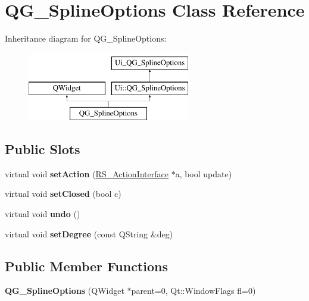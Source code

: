 \hypertarget{classQG__SplineOptions}{\section{Q\-G\-\_\-\-Spline\-Options Class Reference}
\label{classQG__SplineOptions}
}
Inheritance diagram for Q\-G\-\_\-\-Spline\-Options\-:\begin{figure}[H]
\begin{center}
\leavevmode
\includegraphics[height=3.000000cm]{classQG__SplineOptions}
\end{center}
\end{figure}
\subsection*{Public Slots}
\begin{DoxyCompactItemize}
\item 
\hypertarget{classQG__SplineOptions_a333671eee57233957fbc4f011434fd77}{virtual void {\bfseries set\-Action} (\hyperlink{classRS__ActionInterface}{R\-S\-\_\-\-Action\-Interface} $\ast$a, bool update)}\label{classQG__SplineOptions_a333671eee57233957fbc4f011434fd77}

\item 
\hypertarget{classQG__SplineOptions_a36d2ec878555209b4eb80b0cf8d1fbdb}{virtual void {\bfseries set\-Closed} (bool c)}\label{classQG__SplineOptions_a36d2ec878555209b4eb80b0cf8d1fbdb}

\item 
\hypertarget{classQG__SplineOptions_a17daaf2263e2b094015b00910e1ee24e}{virtual void {\bfseries undo} ()}\label{classQG__SplineOptions_a17daaf2263e2b094015b00910e1ee24e}

\item 
\hypertarget{classQG__SplineOptions_a0d1c9324c096c78e4773bf52fcf5fe2e}{virtual void {\bfseries set\-Degree} (const Q\-String \&deg)}\label{classQG__SplineOptions_a0d1c9324c096c78e4773bf52fcf5fe2e}

\end{DoxyCompactItemize}
\subsection*{Public Member Functions}
\begin{DoxyCompactItemize}
\item 
\hypertarget{classQG__SplineOptions_a92df3b3c76daf3f0b38506cd974817b5}{{\bfseries Q\-G\-\_\-\-Spline\-Options} (Q\-Widget $\ast$parent=0, Qt\-::\-Window\-Flags fl=0)}\label{classQG__SplineOptions_a92df3b3c76daf3f0b38506cd974817b5}

\end{DoxyCompactItemize}
